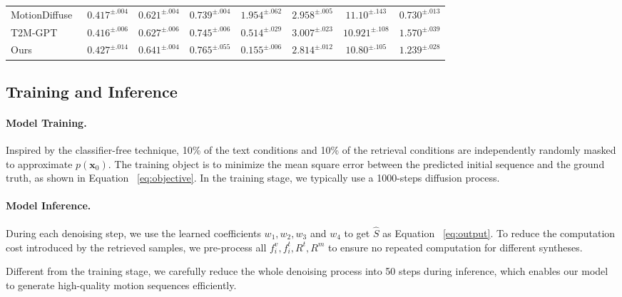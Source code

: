 \documentclass[10pt,twocolumn,letterpaper]{article}
\begin{document}
\begin{table*}[ht]
{\begin{tabular}{lccccccc}
MotionDiffuse~\cite{zhang2022motiondiffuse} & \cellcolor{blue!25}$0.417^{\pm.004}$ & $0.621^{\pm.004}$ & $0.739^{\pm.004}$ &  $1.954^{\pm.062}$ &  \cellcolor{blue!25}$2.958^{\pm.005}$ & \cellcolor{red!25} $11.10^{\pm.143}$ & $0.730^{\pm.013}$\\

T2M-GPT~\cite{zhang2023generating} &  $0.416^{\pm.006}$ & \cellcolor{blue!25} $0.627^{\pm.006}$ & \cellcolor{blue!25}$0.745^{\pm.006}$ & $0.514^{\pm.029}$ & $3.007^{\pm.023}$ & \cellcolor{blue!25} $10.921^{\pm.108}$ & \cellcolor{blue!25} $1.570^{\pm .039}$ \\
\hline

Ours & \cellcolor{red!25}$0.427^{\pm.014}$ & \cellcolor{red!25}$0.641^{\pm.004}$ & \cellcolor{red!25}$0.765^{\pm.055}$ & \cellcolor{red!25}$0.155^{\pm.006}$ & \cellcolor{red!25}$2.814^{\pm.012}$ & $10.80^{\pm.105}$ & $1.239^{\pm.028}$ \\
\hline
\end{tabular}}
\end{table*}


\subsection{Training and Inference}
\label{sec:misc}
\paragraph{Model Training.} 
Inspired by the classifier-free technique, 10\% of the text conditions and 10\% of the retrieval conditions are independently randomly masked to approximate $p({\mathbf{x}_0})$. The training object is to minimize the mean square error between the predicted initial sequence and the ground truth, as shown in Equation ~\ref{eq:objective}. In the training stage, we typically use a 1000-steps diffusion process.




\paragraph{Model Inference.} 

During each denoising step, we use the learned coefficients $w_1,w_2,w_3$ and $w_4$ to get $\widehat{S}$ as Equation ~\ref{eq:output}. To reduce the computation cost introduced by the retrieved samples, we pre-process all $f^v_i, f^t_i, R^t, R^m$ to ensure no repeated computation for different syntheses.

Different from the training stage, we carefully reduce the whole denoising process into 50 steps during inference, which enables our model to generate high-quality motion sequences efficiently.
\end{document}
